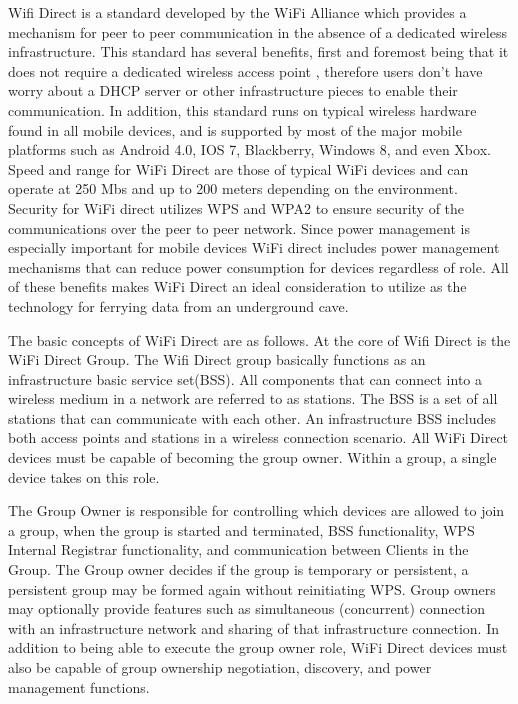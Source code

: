 \documentclass[10pt,twocolumn]{article}
\begin{document}
Wifi Direct is a standard developed by the WiFi Alliance which provides a mechanism for peer to peer communication in the absence of a dedicated wireless infrastructure. 
This standard has several benefits, first and foremost being that it does not require a dedicated wireless access point \cite{whywifid}
, therefore users don't have worry about a DHCP server or other infrastructure pieces to enable their communication. 
In addition, this standard runs on typical wireless hardware found in all mobile devices, and is supported by most of the major mobile platforms such as Android 4.0, IOS 7, Blackberry, Windows 8, and even Xbox. 
Speed and range for WiFi Direct are those of typical WiFi devices and can operate at 250 Mbs and up to 200 meters depending on the environment. 
Security for WiFi direct utilizes WPS and WPA2 to ensure security of the communications over the peer to peer network. 
Since power management is especially important for mobile devices WiFi direct includes power management mechanisms that can reduce power consumption for devices regardless of role.
All of these benefits makes WiFi Direct an ideal consideration to utilize as the technology for ferrying data from an underground cave.

The basic concepts of WiFi Direct are as follows. 
At the core of Wifi Direct is the WiFi Direct Group. 
The Wifi Direct group basically functions as an infrastructure basic service set(BSS). 
All components that can connect into a wireless medium in a network are referred to as stations. 
The BSS is a set of all stations that can communicate with each other. 
An infrastructure BSS includes both access points and stations in a wireless connection scenario.\cite{wirelesslanwiki}
All WiFi Direct devices must be capable of becoming the group owner. 
Within a group, a single device takes on this role.
 
The Group Owner is responsible for controlling which devices are allowed to join a group, when the group is started and terminated, BSS functionality, WPS Internal Registrar functionality, and communication between Clients in the Group. 
The Group owner decides if the group is temporary or persistent, a persistent group may be formed again without reinitiating WPS.
Group owners may optionally provide features such as simultaneous (concurrent) connection with an infrastructure network and sharing of that infrastructure connection. 
In addition to being able to execute the group owner role, WiFi Direct devices must also be capable of group ownership negotiation, discovery, and power management functions.
 
\end{document}
